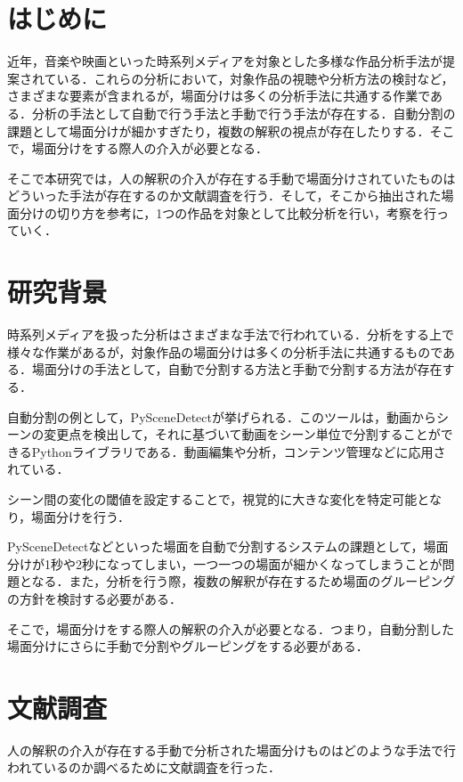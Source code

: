 
\section{はじめに}

近年，音楽や映画といった時系列メディアを対象とした多様な作品分析手法が提案されている．これらの分析において，対象作品の視聴や分析方法の検討など，さまざまな要素が含まれるが，場面分けは多くの分析手法に共通する作業である．分析の手法として自動で行う手法と手動で行う手法が存在する．自動分割の課題として場面分けが細かすぎたり，複数の解釈の視点が存在したりする．そこで，場面分けをする際人の介入が必要となる．

そこで本研究では，人の解釈の介入が存在する手動で場面分けされていたものはどういった手法が存在するのか文献調査を行う．そして，そこから抽出された場面分けの切り方を参考に，1つの作品を対象として比較分析を行い，考察を行っていく．


\section{研究背景}
時系列メディアを扱った分析はさまざまな手法で行われている．分析をする上で様々な作業があるが，対象作品の場面分けは多くの分析手法に共通するものである．場面分けの手法として，自動で分割する方法と手動で分割する方法が存在する．

自動分割の例として，PySceneDetect\cite{PySceneDetect}が挙げられる．このツールは，動画からシーンの変更点を検出して，それに基づいて動画をシーン単位で分割することができるPythonライブラリである．動画編集や分析，コンテンツ管理などに応用されている．

シーン間の変化の閾値を設定することで，視覚的に大きな変化を特定可能となり，場面分けを行う．

PySceneDetectなどといった場面を自動で分割するシステムの課題として，場面分けが1秒や2秒になってしまい，一つ一つの場面が細かくなってしまうことが問題となる．また，分析を行う際，複数の解釈が存在するため場面のグルーピングの方針を検討する必要がある．

そこで，場面分けをする際人の解釈の介入が必要となる．つまり，自動分割した場面分けにさらに手動で分割やグルーピングをする必要がある．

\section{文献調査}\label{sec:related_works}
人の解釈の介入が存在する手動で分析された場面分けものはどのような手法で行われているのか調べるために文献調査を行った．

